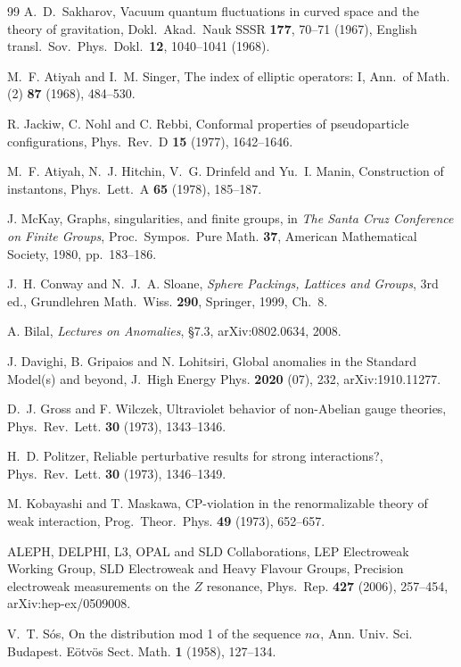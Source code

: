 \documentclass[aps,pra,onecolumn,superscriptaddress,nofootinbib,10pt]{revtex4-2}
\theoremstyle{definition}
\theoremstyle{remark}
\begin{document}
\begin{thebibliography}{99}
 A.~D.~Sakharov, Vacuum quantum fluctuations in curved space and the theory of gravitation, Dokl.\ Akad.\ Nauk SSSR \textbf{177}, 70--71 (1967), English transl.\ Sov.\ Phys.\ Dokl.\ \textbf{12}, 1040--1041 (1968).

 M.~F. Atiyah and I.~M. Singer, The index of elliptic operators: I, Ann.\ of Math. (2) \textbf{87} (1968), 484--530.

 R. Jackiw, C. Nohl and C. Rebbi, Conformal properties of pseudoparticle configurations, Phys.\ Rev.\ D \textbf{15} (1977), 1642--1646.

 M.~F. Atiyah, N.~J. Hitchin, V.~G. Drinfeld and Yu.~I. Manin, Construction of instantons, Phys.\ Lett.\ A \textbf{65} (1978), 185--187.

 J. McKay, Graphs, singularities, and finite groups, in \emph{The Santa Cruz Conference on Finite Groups}, Proc.\ Sympos.\ Pure Math. \textbf{37}, American Mathematical Society, 1980, pp.~183--186.

 J.~H. Conway and N.~J.~A. Sloane, \emph{Sphere Packings, Lattices and Groups}, 3rd ed., Grundlehren Math.\ Wiss. \textbf{290}, Springer, 1999, Ch.~8.

 A. Bilal, \emph{Lectures on Anomalies}, \S7.3, arXiv:0802.0634, 2008.

 J. Davighi, B. Gripaios and N. Lohitsiri, Global anomalies in the Standard Model(s) and beyond, J.\ High Energy Phys. \textbf{2020} (07), 232, arXiv:1910.11277.

 D.~J. Gross and F. Wilczek, Ultraviolet behavior of non-Abelian gauge theories, Phys.\ Rev.\ Lett. \textbf{30} (1973), 1343--1346.

 H.~D. Politzer, Reliable perturbative results for strong interactions?, Phys.\ Rev.\ Lett. \textbf{30} (1973), 1346--1349.

 M. Kobayashi and T. Maskawa, CP-violation in the renormalizable theory of weak interaction, Prog.\ Theor.\ Phys. \textbf{49} (1973), 652--657.

 ALEPH, DELPHI, L3, OPAL and SLD Collaborations, LEP Electroweak Working Group, SLD Electroweak and Heavy Flavour Groups, Precision electroweak measurements on the $Z$ resonance, Phys.\ Rep. \textbf{427} (2006), 257--454, arXiv:hep-ex/0509008.

 V.~T. S\'os, On the distribution mod 1 of the sequence $n\alpha$, Ann. Univ. Sci. Budapest. E\"otv\"os Sect. Math. \textbf{1} (1958), 127--134.


\end{thebibliography}
\end{document}
